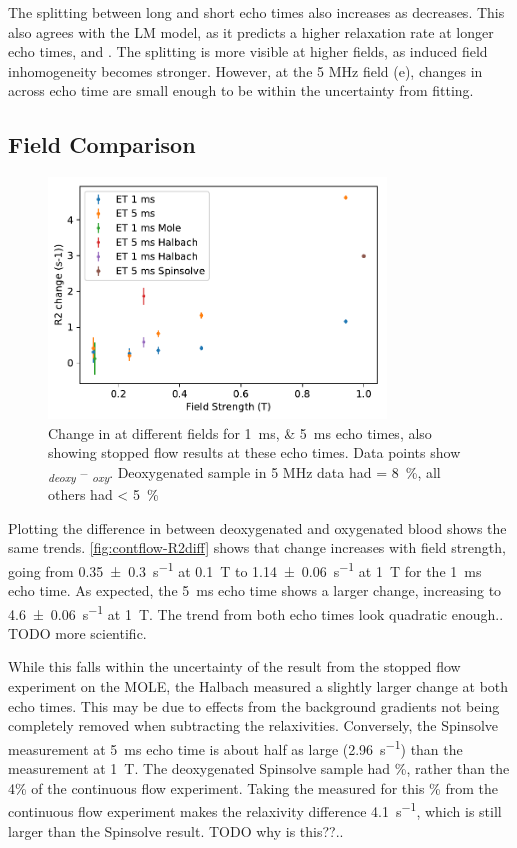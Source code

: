The splitting between long and short echo times also increases as \SOtwo decreases.
This also agrees with the LM model, as it predicts a higher relaxation rate at longer echo times, and .
The splitting is more visible at higher fields, as induced field inhomogeneity becomes stronger.
However, at the 5 MHz field (e), changes in \Rtwo across echo time are small enough to be within the uncertainty from fitting.

\subsection{Field Comparison}
\begin{figure}[ht]
\centering
\includegraphics[width=0.8\textwidth]{figures/contflow/R2fieldDep.pdf}
\caption[Change in \Rtwo at different fields]{Change in \Rtwo at different fields for \SIlist{1;5}{ms} echo times, also showing stopped flow results at these echo times. Data points show \Rtwo\textsubscript{\textit{deoxy}} -- \Rtwo\textsubscript{\textit{oxy}}. Deoxygenated sample in 5 MHz data had \SOtwo = \SI{8}{\percent}, all others had \SOtwo < \SI{5}{\percent}}
\label{fig:contflow-R2diff}
\end{figure}

Plotting the difference in \Rtwo between deoxygenated and oxygenated blood shows the same trends.
\autoref{fig:contflow-R2diff} shows that \Rtwo change increases with field strength, going from \SI{0.35\pm0.3}{s^{-1}} at \SI{0.1}{T} to \SI{1.14\pm0.06}{s^{-1}} at \SI{1}{T} for the \SI{1}{ms} echo time.
As expected, the \SI{5}{ms} echo time shows a larger \Rtwo change, increasing to \SI{4.6\pm0.06}{s^{-1}} at \SI{1}{T}.
The trend from both echo times look quadratic enough.. TODO more scientific.

While this falls within the uncertainty of the result from the stopped flow experiment on the MOLE, the Halbach measured a slightly larger \Rtwo change at both echo times.
This may be due to effects from the background gradients not being completely removed when subtracting the relaxivities.
Conversely, the Spinsolve measurement at \SI{5}{ms} echo time is about half as large (\SI{2.96}{s^{-1}}) than the measurement at \SI{1}{T}.
The deoxygenated Spinsolve sample had \%, rather than the 4\% of the continuous flow experiment.
Taking the measured \Rtwo for this \%  from the continuous flow experiment makes the relaxivity difference \SI{4.1}{s^{-1}}, which is still larger than the Spinsolve result.
TODO why is this??..

